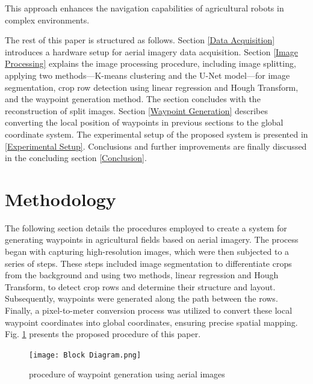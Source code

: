 \documentclass[conference]{IEEEtran}
\begin{document}
This approach enhances the navigation capabilities of agricultural robots in complex environments.

	The rest of this paper is structured as follows. Section \ref{Data Acquisition} introduces a hardware setup for aerial imagery data acquisition. Section \ref{Image Processing} explains the image processing procedure, including image splitting, applying two methods—K-means clustering and the U-Net model—for image segmentation, crop row detection using linear regression and Hough Transform, and the waypoint generation method. The section concludes with the reconstruction of split images. Section \ref{Waypoint Generation} describes converting the local position of waypoints in previous sections to the global coordinate system. The experimental setup of the proposed system is presented in \ref{Experimental Setup}. Conclusions and further improvements are finally discussed in the concluding section
	\ref{Conclusion}.
	
	\section{Methodology}
	
	The following section details the procedures employed to create a system for generating waypoints in agricultural fields based on aerial imagery. The process began with capturing high-resolution images, which were then subjected to a series of steps. These steps included image segmentation to differentiate crops from the background and using two methods, linear regression and Hough Transform, to detect crop rows and determine their structure and layout. Subsequently, waypoints were generated along the path between the rows. Finally, a pixel-to-meter conversion process was utilized to convert these local waypoint coordinates into global coordinates, ensuring precise spatial mapping. Fig. \ref{fig_procedure} presents the proposed procedure of this paper.
	
	\begin{figure}[t]
		\texttt{[image: Block Diagram.png]}
		\caption{procedure of waypoint generation using aerial images
			\cite{b5}}
		\label{fig_procedure}
	\end{figure}
	
\end{document}
